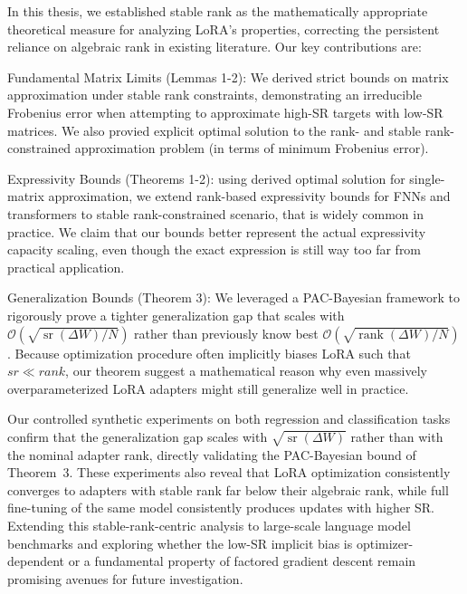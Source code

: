 \documentclass[a4paper,14pt]{extarticle}
\DeclareMathOperator{\rank}{rank}
\DeclareMathOperator{\sr}{sr}
\begin{document}
    In this thesis, we established stable rank as the mathematically appropriate theoretical measure for analyzing LoRA's properties, correcting the persistent reliance on algebraic rank in existing literature. Our key contributions are:
    
    Fundamental Matrix Limits (Lemmas 1-2): We derived strict bounds on matrix approximation under stable rank constraints, demonstrating an irreducible Frobenius error when attempting to approximate high-SR targets with low-SR matrices. We also provied explicit optimal solution to the rank- and stable rank-constrained approximation problem (in terms of minimum Frobenius error).

    Expressivity Bounds (Theorems 1-2): using derived optimal solution for single-matrix approximation, we extend rank-based expressivity bounds \cite{zeng2024expressivepowerlowrankadaptation} for FNNs and transformers to stable rank-constrained scenario, that is widely common in practice. We claim that our bounds better represent the actual expressivity capacity scaling, even though the exact expression is still way too far from practical application.
    
    Generalization Bounds (Theorem 3): We leveraged a PAC-Bayesian framework to rigorously prove a tighter generalization gap that scales with $\mathcal{O}(\sqrt{\sr(\Delta W) / N})$ rather than previously know best $\mathcal{O}(\sqrt{\rank(\Delta W) / N})$. Because optimization procedure often implicitly biases LoRA such that $sr \ll rank$, our theorem suggest a mathematical reason why even massively overparameterized LoRA adapters might still generalize well in practice.
    
    Our controlled synthetic experiments on both regression and classification tasks confirm that the generalization gap scales with $\sqrt{\sr(\Delta W)}$ rather than with the nominal adapter rank, directly validating the PAC-Bayesian bound of Theorem~3.
    These experiments also reveal that LoRA optimization consistently converges to adapters with stable rank far below their algebraic rank, while full fine-tuning of the same model consistently produces updates with higher SR.
    Extending this stable-rank-centric analysis to large-scale language model benchmarks and exploring whether the low-SR implicit bias is optimizer-dependent or a fundamental property of factored gradient descent remain promising avenues for future investigation.


    
    
\end{document}
